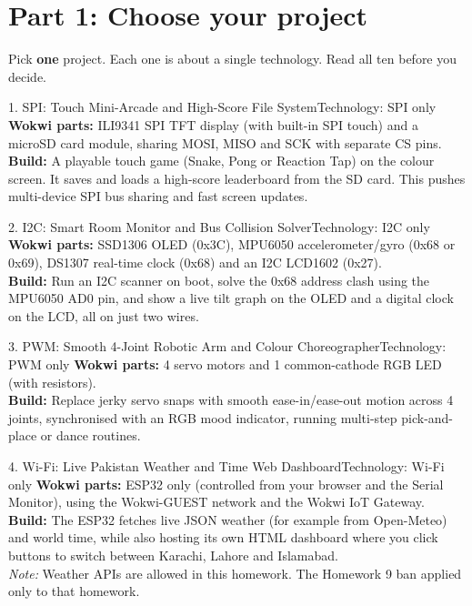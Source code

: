 \documentclass[11pt,a4paper]{article}
\begin{document}
\section*{Part 1: Choose your project}
Pick \textbf{one} project. Each one is about a single technology. Read all ten before you decide.

\begin{proj}{1. SPI: Touch Mini-Arcade and High-Score File System}{Technology: SPI only}
\textbf{Wokwi parts:} ILI9341 SPI TFT display (with built-in SPI touch) and a microSD card module, sharing MOSI, MISO and SCK with separate CS pins.\\
\textbf{Build:} A playable touch game (Snake, Pong or Reaction Tap) on the colour screen. It saves and loads a high-score leaderboard from the SD card. This pushes multi-device SPI bus sharing and fast screen updates.
\end{proj}

\begin{proj}{2. I2C: Smart Room Monitor and Bus Collision Solver}{Technology: I2C only}
\textbf{Wokwi parts:} SSD1306 OLED (0x3C), MPU6050 accelerometer/gyro (0x68 or 0x69), DS1307 real-time clock (0x68) and an I2C LCD1602 (0x27).\\
\textbf{Build:} Run an I2C scanner on boot, solve the 0x68 address clash using the MPU6050 AD0 pin, and show a live tilt graph on the OLED and a digital clock on the LCD, all on just two wires.
\end{proj}

\begin{proj}{3. PWM: Smooth 4-Joint Robotic Arm and Colour Choreographer}{Technology: PWM only}
\textbf{Wokwi parts:} 4 servo motors and 1 common-cathode RGB LED (with resistors).\\
\textbf{Build:} Replace jerky servo snaps with smooth ease-in/ease-out motion across 4 joints, synchronised with an RGB mood indicator, running multi-step pick-and-place or dance routines.
\end{proj}

\begin{proj}{4. Wi-Fi: Live Pakistan Weather and Time Web Dashboard}{Technology: Wi-Fi only}
\textbf{Wokwi parts:} ESP32 only (controlled from your browser and the Serial Monitor), using the Wokwi-GUEST network and the Wokwi IoT Gateway.\\
\textbf{Build:} The ESP32 fetches live JSON weather (for example from Open-Meteo) and world time, while also hosting its own HTML dashboard where you click buttons to switch between Karachi, Lahore and Islamabad.\\
\textit{Note:} Weather APIs are allowed in this homework. The Homework 9 ban applied only to that homework.
\end{proj}
\end{document}
